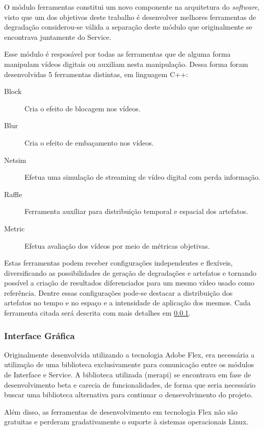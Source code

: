 O módulo ferramentas constitui um novo componente na arquitetura do \emph{software}, visto que um dos objetivos deste trabalho é desenvolver melhores ferramentas de degradação considerou-se válida a separação deste módulo que originalmente se encontrava juntamente do Service.

Esse módulo é resposável por todas as ferramentas que de alguma forma manipulam vídeos digitais ou auxilíam nesta manipulação. Dessa forma foram desenvolvidas 5 ferramentas distintas, em linguagem C++:

\begin{description}
	\item[Block] Cria o efeito de blocagem nos vídeos.
	\item[Blur] Cria o efeito de embaçamento nos vídeos.
	\item[Netsim] Efetua uma simulação de streaming de vídeo digital com perda informação.
	\item[Raffle] Ferramenta auxíliar para distribuição temporal e espacial dos artefatos.
	\item[Metric] Efetua avaliação dos vídeos por meio de métricas objetivas.
\end{description}

Estas ferramentas podem receber configurações independentes e flexíveis, diversificando as possibilidades de geração de degradações e artefatos e tornando possível a criação de resultados diferenciados para um mesmo vídeo usado como referência. Dentre essas configurações pode-se destacar a distribuição dos artefatos no tempo e no espaço e a intensidade de aplicação dos mesmos. Cada ferramenta citada será descrita com mais detalhes em \ref{}. %

\subsubsection{Interface Gráfica}


Originalmente desenvolvida utilizando a tecnologia Adobe Flex, era necessária a utilização de uma biblioteca exclusivamente para comunicação entre os módulos de Interface e Service. A biblioteca utilizada (merapi) se encontrava em fase de desenvolvimento beta e carecia de funcionalidades, de forma que seria necessário buscar uma biblioteca alternativa para continuar o densevolvimento do projeto.

Além disso, as ferramentas de desenvolvimento em tecnologia Flex não são gratuitas e perderam gradativamente o suporte à sistemas operacionais Linux.


